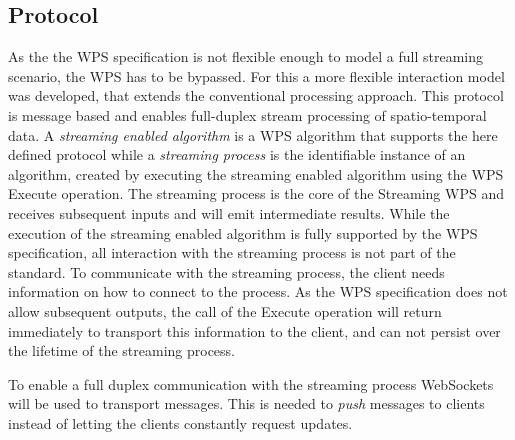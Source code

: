 \subsection{Protocol}
	As the the \ac{WPS} specification is not flexible enough to model a full streaming scenario, the \ac{WPS} has to be bypassed. For this a more flexible interaction model was developed, that extends the conventional processing approach. This protocol is message based and enables full-duplex stream processing of spatio-temporal data. A \emph{streaming enabled algorithm} is a \ac{WPS} algorithm that supports the here defined protocol while a \emph{streaming process} is the identifiable instance of an algorithm, created by executing the streaming enabled algorithm using the \ac{WPS} Execute operation. The streaming process is the core of the Streaming \ac{WPS} and receives subsequent inputs and will emit intermediate results. While the execution of the streaming enabled algorithm is fully supported by the \ac{WPS} specification, all interaction with the streaming process is not part of the standard. To communicate with the streaming process, the client needs information on how to connect to the process. As the \ac{WPS} specification does not allow subsequent outputs, the call of the Execute operation will return immediately to transport this information to the client, and can not persist over the lifetime of the streaming process.

	To enable a full duplex communication with the streaming process WebSockets will be used to transport messages. This is needed to \emph{push} messages to clients instead of letting the clients constantly request updates.

